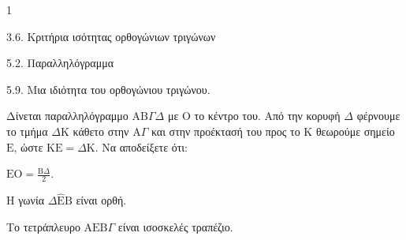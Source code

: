 \begin{ylh}{1}
    \item 3.6. Κριτήρια ισότητας ορθογώνιων τριγώνων
    \item 5.2. Παραλληλόγραμμα
    \item 5.9. Μια ιδιότητα του ορθογώνιου τριγώνου.
\end{ylh}
Δίνεται παραλληλόγραμμο $\mathrm{A}\mathrm{B}\Gamma\Delta$ με $\mathrm{O}$ το κέντρο του. Από την κορυφή $\Delta$ φέρνουμε το τμήμα $\Delta\mathrm{K}$ κάθετο στην $\mathrm{A}\Gamma$ και στην προέκτασή του προς το $\mathrm{K}$ θεωρούμε σημείο $\mathrm{E}$, ώστε $\mathrm{K}\mathrm{E} = \Delta\mathrm{K}$.
Να αποδείξετε ότι:
\begin{alist}
    \item $\mathrm{E}\mathrm{O} = \frac{\mathrm{B}\Delta}{2}$. 
    \item Η γωνία $\Delta\hat{\mathrm{E}}\mathrm{B}$ είναι ορθή. 
    \item Το τετράπλευρο $\mathrm{A}\mathrm{E}\mathrm{B}\Gamma$ είναι ισοσκελές τραπέζιο. 
\end{alist}
